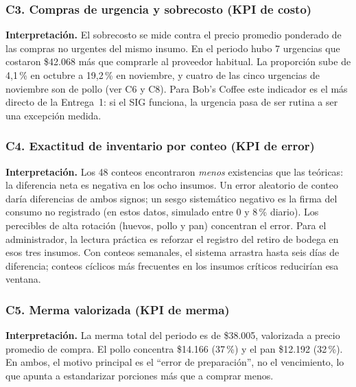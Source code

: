 \documentclass[11pt,letterpaper]{article}
\newcommand{\tablasize}{\footnotesize}
\begin{document}
\subsubsection*{C3. Compras de urgencia y sobrecosto (KPI de costo)}
\begin{table}[H]\centering\tablasize{}\end{table}
\noindent\textbf{Interpretación.} El sobrecosto se mide contra el precio promedio ponderado de las compras no urgentes del mismo insumo. En el periodo hubo 7 urgencias que costaron \$42.068 más que comprarle al proveedor habitual. La proporción sube de 4,1\,\% en octubre a 19,2\,\% en noviembre, y cuatro de las cinco urgencias de noviembre son de pollo (ver C6 y C8). Para Bob's Coffee este indicador es el más directo de la Entrega~1: si el SIG funciona, la urgencia pasa de ser rutina a ser una excepción medida.

\subsubsection*{C4. Exactitud de inventario por conteo (KPI de error)}
\begin{table}[H]\centering\tablasize{}\end{table}
\noindent\textbf{Interpretación.} Los 48 conteos encontraron \emph{menos} existencias que las teóricas: la diferencia neta es negativa en los ocho insumos. Un error aleatorio de conteo daría diferencias de ambos signos; un sesgo sistemático negativo es la firma del consumo no registrado (en estos datos, simulado entre 0 y 8\,\% diario). Los perecibles de alta rotación (huevos, pollo y pan) concentran el error. Para el administrador, la lectura práctica es reforzar el registro del retiro de bodega en esos tres insumos. Con conteos semanales, el sistema arrastra hasta seis días de diferencia; conteos cíclicos más frecuentes en los insumos críticos reducirían esa ventana.

\subsubsection*{C5. Merma valorizada (KPI de merma)}
\begin{table}[H]\centering\tablasize{}\end{table}
\noindent\textbf{Interpretación.} La merma total del periodo es de \$38.005, valorizada a precio promedio de compra. El pollo concentra \$14.166 (37\,\%) y el pan \$12.192 (32\,\%). En ambos, el motivo principal es el ``error de preparación'', no el vencimiento, lo que apunta a estandarizar porciones más que a comprar menos.
\end{document}
